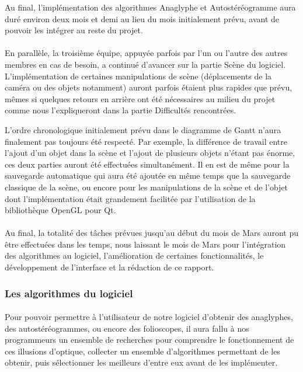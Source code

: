 Au final, l'implémentation des algorithmes Anaglyphe et Autostéréogramme aura duré environ deux mois et demi au lieu du mois initialement prévu, avant de pouvoir les intégrer au reste du projet.

\paragraph{}
En parallèle, la troisième équipe, appuyée parfois par l'un ou l'autre des autres membres en cas de besoin, a continué d'avancer sur la partie Scène du logiciel. L'implémentation de certaines manipulations de scène (déplacements de la caméra ou des objets notamment) auront parfois étaient plus rapides que prévu, mêmes si quelques retours en arrière ont été nécessaires au milieu du projet comme nous l'expliqueront dans la partie Difficultés rencontrées. 

L'ordre chronologique initialement prévu dans le diagramme de Gantt n'aura finalement pas toujours été respecté. Par exemple, la différence de travail entre l'ajout d'un objet dans la scène et l'ajout de plusieurs objets n'étant pas énorme, ces deux parties auront été effectuées simultanément. Il en est de même pour la sauvegarde automatique qui aura été ajoutée en même temps que la sauvegarde classique de la scène, ou encore pour les manipulations de la scène et de l'objet dont l'implémentation était grandement facilitée par l'utilisation de la bibliothèque OpenGL pour Qt.

\paragraph{}
Au final, la totalité des tâches prévues jusqu'au début du mois de Mars auront pu être effectuées dans les temps, nous laissant le mois de Mars pour l'intégration des algorithmes au logiciel, l'amélioration de certaines fonctionnalités, le développement de l'interface et la rédaction de ce rapport.



\subsubsection{Les algorithmes du logiciel}
\paragraph{}
Pour pouvoir permettre à l'utilisateur de notre logiciel d'obtenir des anaglyphes, des autostéréogrammes, ou encore des folioscopes, il aura fallu à nos programmeurs un ensemble de recherches pour comprendre le fonctionnement de ces illusions d'optique, collecter un ensemble d'algorithmes permettant de les obtenir, puis sélectionner les meilleurs d'entre eux avant de les implémenter.

